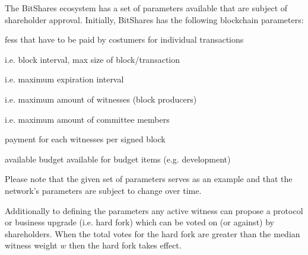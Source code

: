 The BitShares ecosystem has a set of parameters available that are subject of
shareholder approval. Initially, BitShares has the following blockchain
parameters:
%
\begin{description}[leftmargin=4em,style=nextline]
 \item[{fee structure}:        ] fess that have to be paid by costumers for individual transactions
 \item[{block interval}:       ] i.e. block interval, max size of block/transaction
 \item[{expiration parameters}:] i.e. maximum expiration interval
 \item[{witness parameters}:   ] i.e. maximum amount of witnesses (block producers)
 \item[{committee parameters}: ] i.e. maximum amount of committee members
 \item[{witness pay}:          ] payment for each witnesses per signed block
 \item[{worker budget}:        ] available budget available for budget items (e.g. development)
\end{description}
Please note that the given set of parameters serves as an example and that the
network's parameters are subject to change over time.

\medskip

Additionally to defining the parameters any active witness can propose a
protocol or business upgrade (i.e. hard fork) which can be voted on (or
against) by shareholders. When the total votes for the hard fork are greater
than the median witness weight $w$ then the hard fork takes effect.
